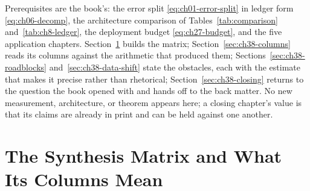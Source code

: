 Prerequisites are the book's: the error split \eqref{eq:ch01-error-split} in ledger
form \eqref{eq:ch06-decomp}, the architecture comparison of
Tables~\ref{tab:comparison} and~\ref{tab:ch8-ledger}, the deployment budget
\eqref{eq:ch27-budget}, and the five application chapters. Section~\ref{sec:ch38-matrix}
builds the matrix; Section~\ref{sec:ch38-columns} reads its columns against the arithmetic
that produced them;
Sections~\ref{sec:ch38-roadblocks} and~\ref{sec:ch38-data-shift} state the obstacles, each
with the estimate that makes it precise rather than rhetorical; Section~\ref{sec:ch38-closing}
returns to the question the book opened with and hands off to the back matter. No new
measurement, architecture, or theorem appears here; a closing chapter's value is that its
claims are already in print and can be held against one another.

\section{The Synthesis Matrix and What Its Columns Mean}
\label{sec:ch38-matrix}

